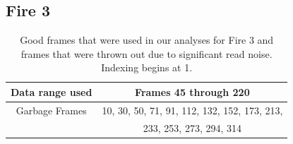 \documentclass{article}
\begin{document}
\pagebreak

\subsection{Fire 3}



\begin{table}
\centering
\begin{tabular}{|c|c|}
\hline
Data range used & Frames 45 through 220 \\
\hline 
Garbage Frames & 10, 30, 50, 71, 91, 112, 132, 152, 173, 213, \\
               & 233, 253, 273, 294, 314 \\

\hline
\end{tabular} 

\caption{Good frames that were used in our analyses for Fire 3 and frames that were thrown out due to significant read noise. Indexing begins at 1.}
\end{table}
\end{document}
